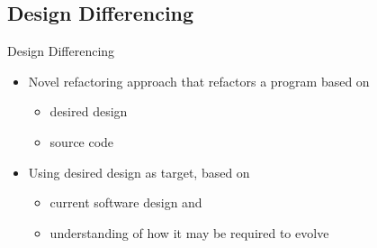 \documentclass{beamer}
\begin{document}
\subsection{Design Differencing}

\begin{frame}{Design Differencing}
  
  \begin{itemize}
    \item Novel refactoring approach that refactors a program based on 
    \begin{itemize}
      \item desired design
      \item source code
    \end{itemize}
    \pause
    \item Using desired design as target, based on
    \begin{itemize}
      \item current software design and
      \item understanding of how it may be required to evolve
    \end{itemize}
  \end{itemize}
\end{frame}
\end{document}
